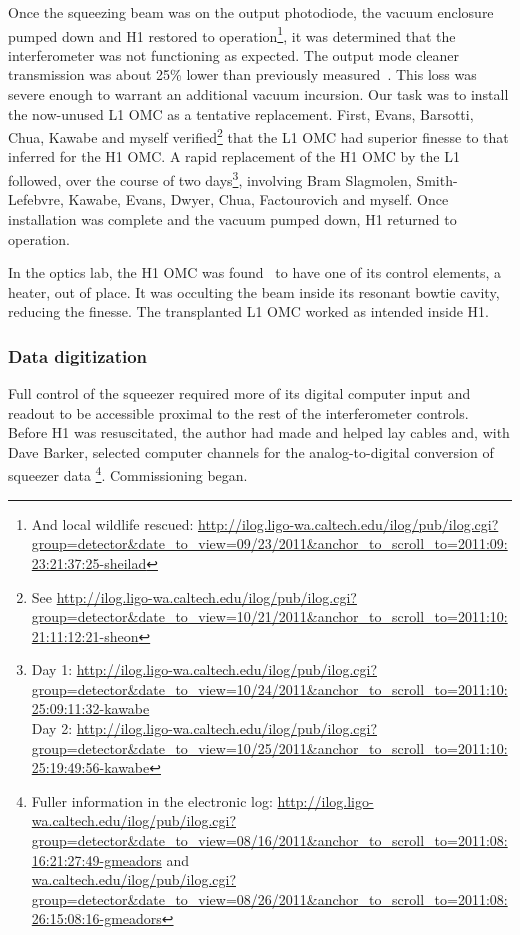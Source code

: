 Once the squeezing beam was on the output photodiode, the vacuum enclosure pumped down and H1 restored to operation\footnote{And local wildlife rescued: \url{http://ilog.ligo-wa.caltech.edu/ilog/pub/ilog.cgi?group=detector&date_to_view=09/23/2011&anchor_to_scroll_to=2011:09:23:21:37:25-sheilad}}, 
it was determined that the interferometer was not functioning as expected.
The output mode cleaner transmission was about 25\% lower than previously measured~\cite{Waldman2011,SmithThesis}.
This loss was severe enough to warrant an additional vacuum incursion.
Our task was to install the now-unused L1 OMC as a tentative replacement. 
First, Evans, Barsotti, Chua, Kawabe and myself verified\footnote{See \url{http://ilog.ligo-wa.caltech.edu/ilog/pub/ilog.cgi?group=detector&date_to_view=10/21/2011&anchor_to_scroll_to=2011:10:21:11:12:21-sheon}} that the L1 OMC had superior finesse to that inferred for the H1 OMC.
A rapid replacement of the H1 OMC by the L1 followed, over the course of two days\footnote{Day 1: \url{http://ilog.ligo-wa.caltech.edu/ilog/pub/ilog.cgi?group=detector&date_to_view=10/24/2011&anchor_to_scroll_to=2011:10:25:09:11:32-kawabe} \\ Day 2: \url{http://ilog.ligo-wa.caltech.edu/ilog/pub/ilog.cgi?group=detector&date_to_view=10/25/2011&anchor_to_scroll_to=2011:10:25:19:49:56-kawabe}},
involving Bram Slagmolen, Smith-Lefebvre, Kawabe, Evans, Dwyer, Chua, Factourovich and myself.
Once installation was complete and the vacuum pumped down, H1 returned to operation.

In the optics lab, the H1 OMC was found~\cite{Waldman2011} to have one of its control elements, a heater, out of place. 
It was occulting the beam inside its resonant bowtie cavity, reducing the finesse.
The transplanted L1 OMC worked as intended inside H1.


            \subsubsection{Data digitization}
            \label{data_digitization}

Full control of the squeezer required more of its digital computer input and readout to be accessible proximal to the rest of the interferometer controls.
Before H1 was resuscitated, the author had made and helped lay cables and, with Dave Barker, selected computer channels for the analog-to-digital conversion of squeezer data \footnote{Fuller information in the electronic log: \url{http://ilog.ligo-wa.caltech.edu/ilog/pub/ilog.cgi?group=detector&date_to_view=08/16/2011&anchor_to_scroll_to=2011:08:16:21:27:49-gmeadors} and \\ \url{wa.caltech.edu/ilog/pub/ilog.cgi?group=detector&date_to_view=08/26/2011&anchor_to_scroll_to=2011:08:26:15:08:16-gmeadors}}.
Commissioning began.

